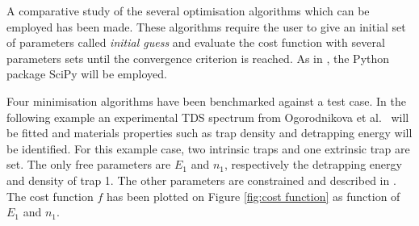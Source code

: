 A comparative study of the several optimisation algorithms which can be employed has been made.
These algorithms require the user to give an initial set of parameters called \textit{initial guess} and evaluate the cost function with several parameters sets until the convergence criterion is reached.
As in , the Python package SciPy  will be employed.

Four minimisation algorithms have been benchmarked against a test case.
In the following example an experimental TDS spectrum from Ogorodnikova et al.\  will be fitted and materials properties such as trap density and detrapping energy will be identified.
For this example case, two intrinsic traps and one extrinsic trap are set.
The only free parameters are $E_1$ and $n_1$, respectively the detrapping energy and density of trap 1.
The other parameters are constrained and described in .
The cost function $f$ has been plotted on Figure \ref{fig:cost function} as function of $E_1$ and $n_1$.

